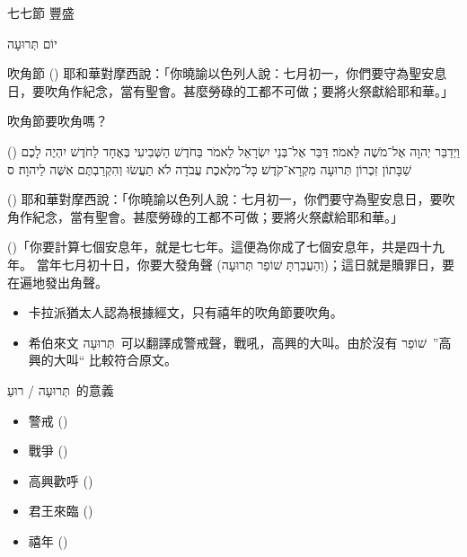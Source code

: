 \documentclass{beamer}
\makeatletter
\newcommand{\biblerefhebrew}[1]{\brm@bibleref{hebrew}{#1}}
\newcommand{\topic}[1]{
  \begin{frame}
    \centering
    \vspace*{1cm}
    {\fontsize{40}{48}\selectfont #1\par}
    \vfill
  \end{frame}
}
\newcommand{\conclusion}[2]{
  \begin{frame}
    \centering
    \vspace*{1cm}
    {\fontsize{40}{48}\selectfont #1 \textemdash #2\par}
    \vfill
  \end{frame}
}
\newcommand{\parvspace}{\par\vspace{0.5em}}
\makeatother
\begin{document}
\conclusion{七七節}{豐盛}

\topic{\texthebrew{יוֹם תְּרוּעָה}}

\begin{frame}{吹角節}
  () 耶和華對摩西說：「你曉諭以色列人說：\alert{七月初一}，你們要守為\alert{聖安息日}，要吹角作紀念，當有聖會。甚麼勞碌的工都不可做；要將火祭獻給耶和華。」\parvspace
\end{frame}

\begin{frame}{吹角節要吹角嗎？}
  \begin{hebrew}
    (\biblerefhebrew{Lv 23:23-25}) וַיְדַבֵּר יְהוָה אֶל־מֹשֶׁה לֵּאמֹר׃ דַּבֵּר אֶל־בְּנֵי יִשְׂרָאֵל לֵאמֹר בַּחֹדֶשׁ הַשְּׁבִיעִי בְּאֶחָד לַחֹדֶשׁ יִהְיֶה לָכֶם שַׁבָּתוֹן זִכְרוֹן \alert{תְּרוּעָה} מִקְרָא־קֹדֶשׁ׃ כָּל־מְלֶאכֶת עֲבֹדָה לֹא תַעֲשׂוּ וְהִקְרַבְתֶּם אִשֶּׁה לַיהוָה׃ ס
  \end{hebrew}\parvspace
  () 耶和華對摩西說：「你曉諭以色列人說：\alert{七月初一}，你們要守為\alert{聖安息日}，要吹角作紀念，當有聖會。甚麼勞碌的工都不可做；要將火祭獻給耶和華。」\parvspace
  ()「你要計算七個安息年，就是七七年。這便為你成了七個安息年，共是四十九年。 當年七月初十日，你要\alert{大發角聲 (\texthebrew{וְהַעֲבַרְתָּ שׁוֹפַר תְּרוּעָה})}；這日就是贖罪日，要在遍地發出角聲。\parvspace
  \begin{itemize}
    \item 卡拉派猶太人認為根據經文，只有禧年的吹角節要吹角。\parencite{Karaism}
    \item 希伯來文 \texthebrew{תְּרוּעָה}\ 可以翻譯成警戒聲，戰吼，高興的大叫。由於沒有 \texthebrew{שׁוֹפַר}\ ”高興的大叫“ 比較符合原文。
  \end{itemize}
\end{frame}

\begin{frame}{\texthebrew{תְּרוּעָה / רוּעַ}\ 的意義}
  \begin{itemize}
    \item 警戒 ()
    \item 戰爭 ()
    \item 高興歡呼 ()
    \item 君王來臨 ()
    \item 禧年 ()
  \end{itemize}
\end{frame}
\end{document}
